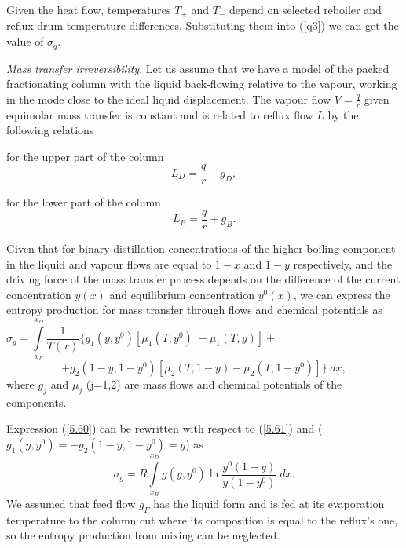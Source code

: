 \documentclass[12pt]{article}
\begin{document}
Given the heat flow, temperatures $T_+$ and $T_-$ depend on selected reboiler and reflux drum temperature differences. Substituting them into (\ref{q3}) we can get the value of $\sigma_q$.

\textit{Mass transfer irreversibility}. Let us assume that we have a model of the packed fractionating column with the liquid back-flowing relative to the vapour, working in the mode close to the ideal liquid displacement.
 The vapour flow $V=\frac{q}{r}$ given equimolar mass transfer is constant and is related to reflux flow $L$ by the following relations

for the upper part of the column
\begin{equation}
L_{D} = \frac{q}{r}-  g_D,
\label{q1}
\end{equation}

for the lower part of the column
\begin{equation}
L_{B}= \frac{q}{r}+ g_{B}.
\label{q2}
\end{equation}

Given that for binary distillation concentrations of the higher boiling component in the liquid and vapour flows are equal to $1-x$ and $1-y$ respectively, and the driving force of the mass transfer process depends on the difference of the current concentration $y(x)$ and equilibrium concentration $y^0(x)$, we can express the entropy production for mass transfer through flows and chemical potentials as
$$
\sigma_g= \int\limits^{x_D}_{x_B}\frac{1}{T(x)} \{ g_1(y, y^0) [ \mu_1(T, y^0) \;
-\mu_1(T, y)]+\phantom{wwwwwwwwwwwwwwwwwwwwwwww}
$$
\begin{equation}\label{5.60}
+ g_2(1-y, 1-y^0)[ \mu_2(T, 1-y)- \mu_2(T, 1-y^0)] \} \; dx,
\end{equation}
where $g_j$ and $\mu_j$ (j=1,2) are mass flows and chemical potentials of the components.

Expression (\ref{5.60}) can be rewritten with respect to (\ref{5.61}) and ($g_1(y, y^0)=- g_2(1-y, 1-y^0)=g$) as
\begin{equation}\label{5.62}
\sigma_g=R \int\limits^{x_D}_{x_B} g(y, y^0)\ln \frac{y^0(1-y)}{y(1-y^0)} \; dx.
\end{equation}
We assumed that feed flow $g_{F}$ has the liquid form and is fed at its evaporation temperature to the column cut where its composition is equal to the reflux's one, so the entropy production from mixing can be neglected.
\end{document}
